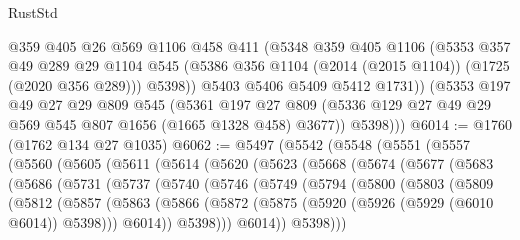 \begin{lexlean}{RustStd}
\begin{coremodule}
            @359
            @405
            @26
            @569
            @1106
            @458
            @411
            (@5348
              @359
              @405
              @1106
              (@5353
                @357
                @49
                @289
                @29
                @1104
                @545
                (@5386 @356 @1104 (@2014 (@2015 @1104)) (@1725 (@2020 @356 @289)))
                @5398))
            @5403
            @5406
            @5409
            @5412
            @1731))
        (@5353
          @197
          @49
          @27
          @29
          @809
          @545
          (@5361
            @197
            @27
            @809
            (@5336 @129 @27 @49 @29 @569 @545 @807 @1656 (@1665 @1328 @458) @3677))
          @5398)))
@6014 := @1760 (@1762 @134 @27 @1035)
@6062 := @5497
    (@5542
      (@5548
        (@5551
          (@5557
            (@5560
              (@5605
                (@5611
                  (@5614
                    (@5620
                      (@5623
                        (@5668
                          (@5674
                            (@5677
                              (@5683
                                (@5686
                                  (@5731
                                    (@5737
                                      (@5740
                                        (@5746
                                          (@5749
                                            (@5794
                                              (@5800
                                                (@5803
                                                  (@5809
                                                    (@5812
                                                      (@5857
                                                        (@5863
                                                          (@5866
                                                            (@5872
                                                              (@5875
                                                                (@5920
                                                                  (@5926
                                                                    (@5929 (@6010 @6014))
                                                                    @5398)))
                                                              @6014))
                                                          @5398)))
                                                    @6014))
                                                @5398)))

\end{coremodule}
\end{lexlean}
